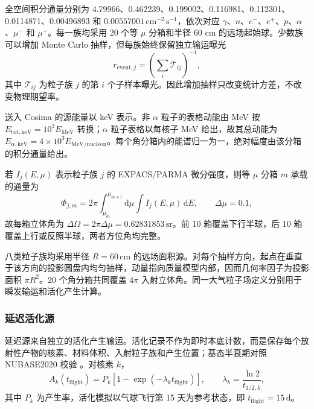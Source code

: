 \documentclass[11pt]{article}
\begin{document}
全空间积分通量分别为 4.79966、0.462239、0.199002、0.116981、0.112301、0.0114871、0.00496893 和 $0.00557001\,\mathrm{cm^{-2}\,s^{-1}}$，依次对应 $\gamma$、$n$、$e^-$、$e^+$、$p$、$\alpha$、$\mu^-$ 和 $\mu^+$。每一族均采用 20 个等 $\mu$ 分箱和半径 60 cm 的远场起始球。少数族可以增加 Monte Carlo 抽样，但每族始终保留独立输运曝光
\begin{equation}
  r_{\mathrm{event},j}=\left(\sum_i \mathcal{T}_{ij}\right)^{-1},
\end{equation}
其中 $\mathcal{T}_{ij}$ 为粒子族 $j$ 的第 $i$ 个子样本曝光。因此增加抽样只改变统计方差，不改变物理期望率。

送入 Cosima 的源能量以 keV 表示。非 $\alpha$ 粒子的表格动能由 MeV 按 $E_{\mathrm{tot,keV}}=10^3E_{\mathrm{MeV}}$ 转换；$\alpha$ 粒子表格以每核子 MeV 给出，故其总动能为 $E_{\alpha,\mathrm{keV}}=4\times10^3E_{\mathrm{MeV/nucleon}}$。每个角分箱内的能谱归一为一，绝对幅度由该分箱的积分通量给出。

若 $I_j(E,\mu)$ 表示粒子族 $j$ 的 EXPACS/PARMA 微分强度，则等 $\mu$ 分箱 $m$ 承载的通量为
\begin{equation}
 \Phi_{j,m}=2\pi\int_{\mu_m}^{\mu_{m+1}}\!\mathrm d\mu
             \int I_j(E,\mu)\,\mathrm dE,
 \qquad \Delta\mu=0.1,
 \label{eq:source_bin_flux_zh}
\end{equation}
故每箱立体角为 $\Delta\Omega=2\pi\Delta\mu=0.62831853\,\mathrm{sr}$。前 10 箱覆盖下行半球，后 10 箱覆盖上行或反照半球，两者方位角均完整。

八类粒子族均采用半径 $R=60\,\mathrm{cm}$ 的远场面积源。对每个抽样方向，起点在垂直于该方向的投影圆盘内均匀抽样，动量指向质量模型内部，因而几何率因子为投影面积 $\pi R^2$。20 个角分箱共同覆盖 $4\pi$ 入射立体角。同一大气粒子场定义分别用于瞬发输运和活化产生计算。

\subsubsection{延迟活化源}
\label{subsec:delayed_source}

延迟源来自独立的活化产生输运。活化记录不作为即时本底计数，而是保存每个放射性产物的核素、材料体积、入射粒子族和产生位置；基态半衰期对照 NUBASE2020 校验 \cite{Kondev2021NUBASE}。对核素 $k$，
\begin{equation}
  A_k(t_{\mathrm{flight}})=P_k\left[1-\exp(-\lambda_k t_{\mathrm{flight}})\right],
  \qquad \lambda_k=\frac{\ln2}{t_{1/2,k}},
\end{equation}
其中 $P_k$ 为产生率，活化模拟以气球飞行第 15 天为参考状态，即
$t_{\mathrm{flight}}=15\,\mathrm{d}$。
\end{document}
